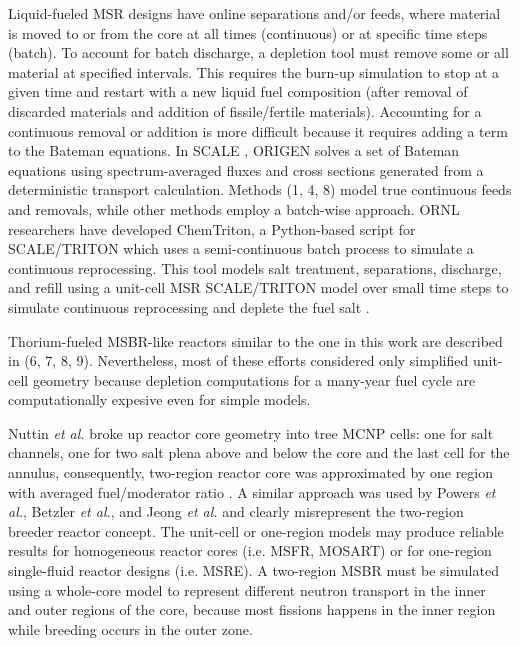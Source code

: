 Liquid-fueled \gls{MSR} designs have online separations and/or feeds, where material is moved to or from the core at all times (continuous) or at specific time steps (batch). To account for batch discharge, a depletion tool must remove some or all material at specified intervals. This requires the burn-up simulation to stop at a given time and restart with a new liquid fuel composition (after removal of discarded materials and addition of fissile/fertile materials). Accounting for a continuous removal or addition is more difficult because it requires adding a term to the Bateman equations. In SCALE \cite{bowman_scale_2011}, ORIGEN \cite{gauld_isotopic_2011} solves a set of Bateman equations using spectrum-averaged fluxes and cross sections generated from a deterministic transport calculation. Methods (1, 4, 8) model true continuous feeds and removals, while other methods employ a batch-wise approach. \gls{ORNL} researchers have developed ChemTriton, a Python-based script for SCALE/TRITON which uses a semi-continuous batch process to simulate a continuous reprocessing. This tool models salt treatment, separations, discharge, and refill using a unit-cell \gls{MSR} SCALE/TRITON model over small time steps to simulate continuous reprocessing and deplete the fuel salt \cite{powers_new_2013}.

Thorium-fueled \gls{MSBR}-like reactors similar to the one in this work are described in (6, 7, 8, 9). Nevertheless, most of these efforts considered only simplified unit-cell geometry because depletion computations for a many-year fuel cycle are computationally expesive even for simple models. 

Nuttin \emph{et al.} broke up reactor core geometry into tree \gls{MCNP} cells: one for salt channels, one for two salt plena above and below the core and the last cell for the annulus, consequently, two-region reactor core was approximated by one region with averaged fuel/moderator ratio \cite{nuttin_potential_2005}.  A similar approach was used by Powers \emph{et al.}, Betzler \emph{et al.}, and Jeong \emph{et al.} \cite{powers_new_2013,powers_inventory_2014,betzler_modeling_2016, betzler_molten_2017, jeong_development_2014, jeong_equilibrium_2016} and clearly misrepresent the two-region breeder reactor concept. The unit-cell or one-region models may produce reliable results for homogeneous reactor cores (i.e. \gls{MSFR}, \gls{MOSART}) or for one-region single-fluid reactor designs (i.e. \gls{MSRE}). A two-region \gls{MSBR} must be simulated using a whole-core model to represent different neutron transport in the inner and outer regions of the core, because most fissions happens in the inner region while breeding occurs in the outer zone.  

